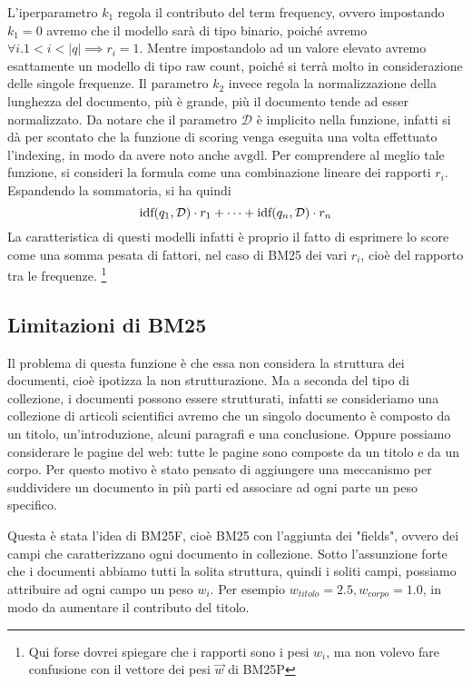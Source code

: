 L'iperparametro $k_1$ regola il contributo del term frequency, ovvero impostando $k_1 = 0$ avremo
che il modello sarà di tipo binario, poiché avremo $\forall i . 1 < i < \left|q\right| \implies r_i = 1$.
Mentre impostandolo ad un valore elevato avremo esattamente un modello di tipo raw count, poiché
si terrà molto in considerazione delle singole frequenze.
Il parametro $k_2$ invece regola la normalizzazione della lunghezza del documento, più è grande,
più il documento tende ad esser normalizzato.
Da notare che il parametro $\mathcal{D}$ è implicito nella funzione, infatti si dà per scontato che
la funzione di scoring venga
eseguita una volta effettuato l'indexing, in modo da avere noto anche $\text{avgdl}$.
Per comprendere al meglio tale funzione, si consideri la formula come una combinazione
lineare dei rapporti $r_i$. Espandendo la sommatoria, si ha quindi
$$
\text{idf}(q_1, \mathcal{D}) \cdot r_1 + \dots + \text{idf}(q_n, \mathcal{D}) \cdot r_n
$$
La caratteristica di questi modelli infatti è proprio il fatto di esprimere lo score come una somma pesata
di fattori, nel caso di BM25 dei vari $r_i$,  cioè del rapporto tra le frequenze. \footnote{Qui forse dovrei spiegare che i rapporti sono i pesi $w_i$, ma non volevo fare confusione con il vettore dei pesi $\vec{w}$ di BM25P}

\subsection{Limitazioni di BM25}

Il problema di questa funzione è che essa non considera la struttura dei documenti, cioè ipotizza
la non strutturazione.
Ma a seconda del tipo di collezione, i documenti possono essere strutturati, infatti
se consideriamo una collezione di articoli scientifici avremo che un singolo documento è composto da un titolo, 
un'introduzione, alcuni paragrafi e una conclusione.
Oppure possiamo considerare le pagine del web: tutte le pagine sono composte da un titolo e da un corpo.
Per questo motivo è stato pensato di aggiungere una meccanismo per suddividere un documento in
più parti ed associare ad ogni parte un peso specifico.

Questa è stata l'idea di BM25F, cioè BM25 con l'aggiunta dei "fields", ovvero dei campi che caratterizzano ogni documento in collezione.
Sotto l'assunzione forte che i documenti abbiamo tutti la solita struttura, quindi i soliti campi,
possiamo attribuire ad ogni campo un peso  $w_i$.
Per esempio $w_{titolo} = 2.5, w_{corpo} = 1.0$, in modo da aumentare il contributo del titolo.

